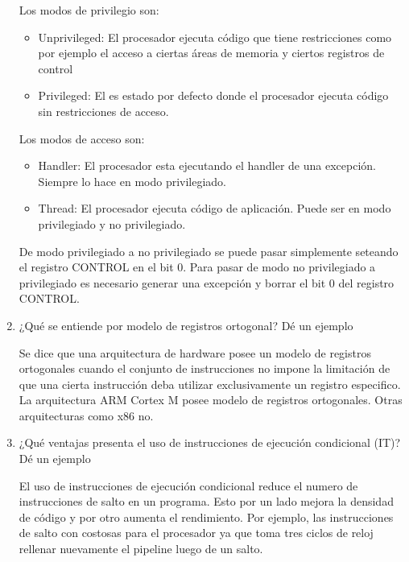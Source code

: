 \documentclass[12pt, a4paper]{article}
\makeatletter
\newcommand\setItemnumber[1]{\setcounter{enum\romannumeral\@enumdepth}{\numexpr#1-1\relax}}
\makeatother
\begin{document}
\begin{enumerate}
    Los modos de privilegio son:
    
      \begin{itemize}
        \item Unprivileged: El procesador ejecuta código que tiene restricciones como por ejemplo
        el acceso a ciertas áreas de memoria y ciertos registros de control
        \item Privileged: El es estado por defecto donde el procesador ejecuta código sin restricciones de 
        acceso.
    \end{itemize}
    
    Los modos de acceso son:
    
    \begin{itemize}
        \item Handler: El procesador esta ejecutando el handler de una excepción. Siempre
        lo hace en modo privilegiado.
        \item Thread: El procesador ejecuta código de aplicación. Puede ser en modo 
        privilegiado y no privilegiado.
    \end{itemize}
    
    De modo privilegiado a no privilegiado se puede pasar simplemente seteando el registro CONTROL en el bit 0.
    Para pasar de modo no privilegiado a privilegiado es necesario generar una excepción y borrar el bit 0 
    del registro CONTROL.

    \setItemnumber{7}
    \item ¿Qué se entiende por modelo de registros ortogonal? Dé un ejemplo
    
    Se dice que una arquitectura de hardware posee un modelo de registros ortogonales 
    cuando el conjunto de instrucciones no impone la limitación de que una cierta instrucción
    deba utilizar exclusivamente un registro especifico. La arquitectura ARM Cortex M posee
    modelo de registros ortogonales. Otras arquitecturas como x86 no.
    
    
    \setItemnumber{8}
    \item ¿Qué ventajas presenta el uso de instrucciones de ejecución condicional (IT)? Dé un
    ejemplo
    
    El uso de instrucciones de ejecución condicional reduce el numero de instrucciones de salto
    en un programa. Esto por un lado mejora la densidad de código y por otro aumenta el rendimiento.
    Por ejemplo, las instrucciones de salto con costosas para el procesador ya que toma tres ciclos de 
    reloj rellenar nuevamente el pipeline luego de un salto. 


\end{enumerate}
\end{document}
